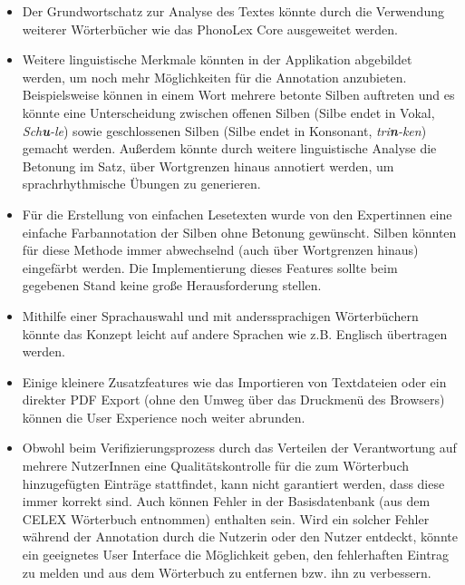 \begin{itemize}
	\item Der Grundwortschatz zur Analyse des Textes könnte durch die Verwendung weiterer Wörterbücher wie das PhonoLex Core ausgeweitet werden.
	
	\item Weitere linguistische Merkmale könnten in der Applikation abgebildet werden, um noch mehr Möglichkeiten für die Annotation anzubieten. Beispielsweise können in einem Wort mehrere betonte Silben auftreten und es könnte eine Unterscheidung zwischen offenen Silben (Silbe endet in Vokal, \textit{Sch\textbf{u}-le}) sowie geschlossenen Silben (Silbe endet in Konsonant, \textit{tri\textbf{n}-ken}) gemacht werden. Außerdem könnte durch weitere linguistische Analyse die Betonung im Satz, über Wortgrenzen hinaus annotiert werden, um sprachrhythmische Übungen zu generieren.
	
	\item Für die Erstellung von einfachen Lesetexten wurde von den Expertinnen eine einfache Farbannotation der Silben ohne Betonung gewünscht. Silben könnten für diese Methode immer abwechselnd (auch über Wortgrenzen hinaus) eingefärbt werden. Die Implementierung dieses Features sollte beim gegebenen Stand keine große Herausforderung stellen.
	
	\item Mithilfe einer Sprachauswahl und mit anderssprachigen Wörterbüchern könnte das Konzept leicht auf andere Sprachen wie z.B. Englisch übertragen werden.
	
	\item Einige kleinere Zusatzfeatures wie das Importieren von Textdateien oder ein direkter PDF Export (ohne den Umweg über das Druckmenü des Browsers) können die User Experience noch weiter abrunden.
	
	\item Obwohl beim Verifizierungsprozess durch das Verteilen der Verantwortung auf mehrere NutzerInnen eine Qualitätskontrolle für die zum Wörterbuch hinzugefügten Einträge stattfindet, kann nicht garantiert werden, dass diese immer korrekt sind. Auch können Fehler in der Basisdatenbank (aus dem CELEX Wörterbuch entnommen) enthalten sein. Wird ein solcher Fehler während der Annotation durch die Nutzerin oder den Nutzer entdeckt, könnte ein geeignetes User Interface die Möglichkeit geben, den fehlerhaften Eintrag zu melden und aus dem Wörterbuch zu entfernen bzw. ihn zu verbessern.
\end{itemize}

